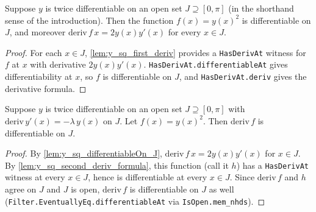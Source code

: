 \begin{lemma}[$y^2$ is differentiable on $J$]
    \label{lem:y_sq_differentiableOn_J}
    \leanok
    Suppose $y$ is twice differentiable on an open set $J \supseteq [0,\pi]$
    (in the shorthand sense of the introduction). Then the function
    $f(x) = y(x)^2$ is differentiable on $J$, and moreover
    $\mathrm{deriv}\, f\, x = 2 y(x) y'(x)$ for every $x \in J$.
\end{lemma}
\begin{proof}
    For each $x \in J$, \cref{lem:y_sq_first_deriv} provides a \texttt{HasDerivAt}
    witness for $f$ at $x$ with derivative $2 y(x) y'(x)$. \texttt{HasDerivAt.differentiableAt}
    gives differentiability at $x$, so $f$ is differentiable on $J$, and
    \texttt{HasDerivAt.deriv} gives the derivative formula.
\end{proof}

\begin{lemma}
    \label{lem:y_sq_deriv_differentiableOn_J}
    \leanok
    Suppose $y$ is twice differentiable on an open set $J \supseteq [0,\pi]$
    with $\mathrm{deriv}\, y'(x) = -\lambda \, y(x)$ on $J$. Let $f(x) = y(x)^2$.
    Then $\mathrm{deriv}\, f$ is differentiable on $J$.
\end{lemma}
\begin{proof}
    By \cref{lem:y_sq_differentiableOn_J}, $\mathrm{deriv}\, f\, x = 2 y(x) y'(x)$
    for $x \in J$. By \cref{lem:y_sq_second_deriv_formula}, this function (call it
    $h$) has a \texttt{HasDerivAt} witness at every $x \in J$, hence is
    differentiable at every $x \in J$. Since $\mathrm{deriv}\, f$ and $h$ agree on
    $J$ and $J$ is open, $\mathrm{deriv}\, f$ is differentiable on $J$ as well
    (\texttt{Filter.EventuallyEq.differentiableAt} via \texttt{IsOpen.mem\_nhds}).
\end{proof}

